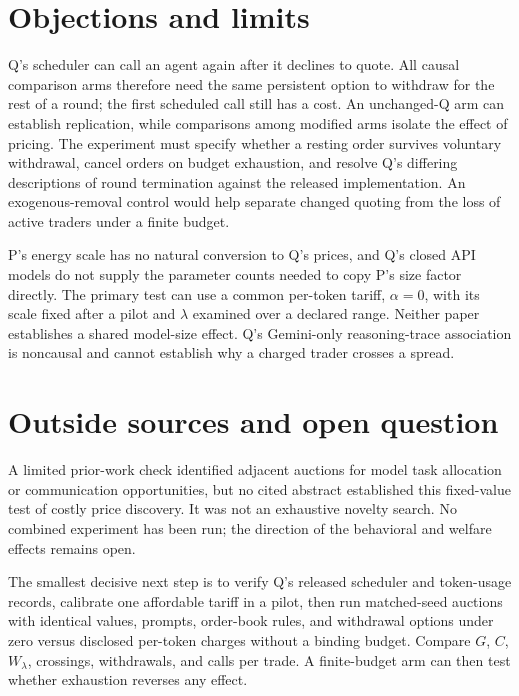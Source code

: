 \documentclass{article}
\begin{document}
\section*{Objections and limits}
Q's scheduler can call an agent again after it declines to quote. All causal comparison arms therefore need the same persistent option to withdraw for the rest of a round; the first scheduled call still has a cost. An unchanged-Q arm can establish replication, while comparisons among modified arms isolate the effect of pricing. The experiment must specify whether a resting order survives voluntary withdrawal, cancel orders on budget exhaustion, and resolve Q's differing descriptions of round termination against the released implementation. An exogenous-removal control would help separate changed quoting from the loss of active traders under a finite budget. 

P's energy scale has no natural conversion to Q's prices, and Q's closed API models do not supply the parameter counts needed to copy P's size factor directly. The primary test can use a common per-token tariff, \(\alpha=0\), with its scale fixed after a pilot and \(\lambda\) examined over a declared range. Neither paper establishes a shared model-size effect. Q's Gemini-only reasoning-trace association is noncausal and cannot establish why a charged trader crosses a spread. 

\section*{Outside sources and open question}
A limited prior-work check identified adjacent auctions for model task allocation or communication opportunities, but no cited abstract established this fixed-value test of costly price discovery. It was not an exhaustive novelty search. No combined experiment has been run; the direction of the behavioral and welfare effects remains open. 

The smallest decisive next step is to verify Q's released scheduler and token-usage records, calibrate one affordable tariff in a pilot, then run matched-seed auctions with identical values, prompts, order-book rules, and withdrawal options under zero versus disclosed per-token charges without a binding budget. Compare \(G\), \(C\), \(W_\lambda\), crossings, withdrawals, and calls per trade. A finite-budget arm can then test whether exhaustion reverses any effect. 
\end{document}
